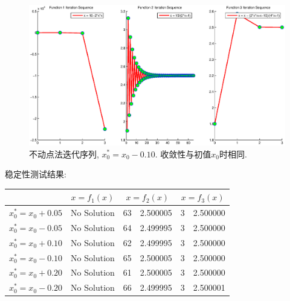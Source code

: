 \documentclass{article}
\begin{document}
\begin{CJK*}{UTF8}{song}
				\begin{figure}[H]
					\centering
					\includegraphics[width=1.0\textwidth]{../chapter2_1_0_4.eps}
					\caption{不动点法迭代序列, $x_0^{*} = x_0 - 0.10$. 收敛性与初值$x_0$时相同.}
					\label{img_chapter2_1_0_4}
				\end{figure}
				
				稳定性测试结果:\\
				\begin{center}
					\begin{tabular}{|c|c|c|c|c|c|c|}
						\hline
						&\multicolumn{2}{|c|}{$x = f_1\left(x\right)$}  & \multicolumn{2}{|c|}{$x = f_2\left(x\right)$} &\multicolumn{2}{|c|}{$x = f_3\left(x\right)$} \\
						\hline
						$x_0^{*} = x_0 + 0.05$ & \multicolumn{2}{|c|}{No Solution} & 63& 2.500005& 3&2.500000 \\
						\hline
						$x_0^{*} = x_0 - 0.05$ & \multicolumn{2}{|c|}{No Solution} &64 &2.499995 & 3& 2.500000\\
						\hline
						$x_0^{*} = x_0 + 0.10$ & \multicolumn{2}{|c|}{No Solution} & 62&2.499995 &3 &2.500000 \\
						\hline
						$x_0^{*} = x_0 - 0.10$ & \multicolumn{2}{|c|}{No Solution} & 65& 2.500005& 3&2.500000 \\
						\hline
						$x_0^{*} = x_0 + 0.20$ & \multicolumn{2}{|c|}{No Solution} &61 &2.500005 & 3& 2.500000\\
						\hline
						$x_0^{*} = x_0 - 0.20$ & \multicolumn{2}{|c|}{No Solution} & 66&2.499995 &3 &2.500001 \\
						\hline
					\end{tabular}
				\end{center}
			

\end{CJK*}
\end{document}
